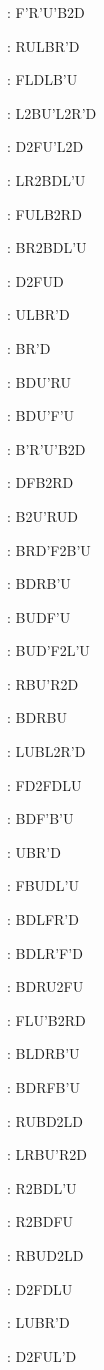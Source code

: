 \documentclass[9pt]{article}
\begin{document}
{\begin{multicols}{6}
: F'R'U'B2D

: RULBR'D

: FLDLB'U

: L2BU'L2R'D

: D2FU'L2D

: LR2BDL'U

: FULB2RD

: BR2BDL'U

: D2FUD

: ULBR'D

: BR'D

: BDU'RU

: BDU'F'U

: B'R'U'B2D

: DFB2RD

: B2U'RUD

: BRD'F2B'U

: BDRB'U

: BUDF'U

: BUD'F2L'U

: RBU'R2D

: BDRBU

: LUBL2R'D

: FD2FDLU

: BDF'B'U

: UBR'D

: FBUDL'U

: BDLFR'D

: BDLR'F'D

: BDRU2FU

: FLU'B2RD

: BLDRB'U

: BDRFB'U

: RUBD2LD

: LRBU'R2D

: R2BDL'U

: R2BDFU

: RBUD2LD

: D2FDLU

: LUBR'D

: D2FUL'D


\end{multicols}}
\end{document}
